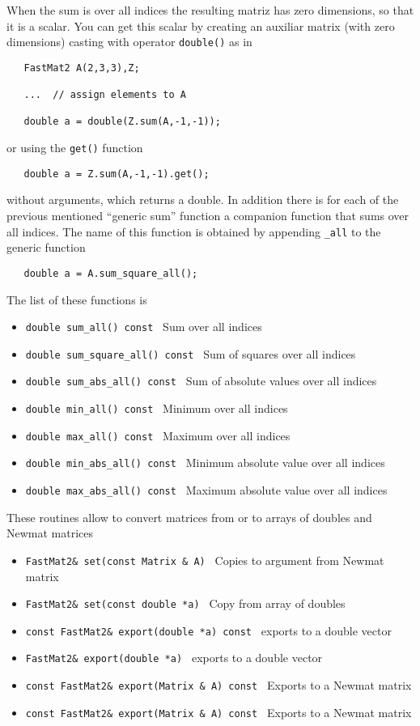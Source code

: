 {

When the sum is over all indices the resulting matriz has zero
dimensions, so that it is a scalar. You can get this scalar by
creating an auxiliar matrix (with zero dimensions) casting with
operator \verb+double()+ as in
%
\begin{verbatim}
   FastMat2 A(2,3,3),Z;

   ...  // assign elements to A

   double a = double(Z.sum(A,-1,-1));
\end{verbatim}
%
or using the \verb+get()+ function 
%
\begin{verbatim}
   double a = Z.sum(A,-1,-1).get();
\end{verbatim}
%
without arguments, which returns a double. In addition there is for
each of the previous mentioned ``generic sum'' function a companion
function that sums over all indices. The name of this function is
obtained by appending \verb+_all+ to the generic function
%
\begin{verbatim}
   double a = A.sum_square_all();
\end{verbatim}
%
The list of these functions is
%
\begin{itemize}
\item \verb+double sum_all() const +
              Sum over all indices 
\item \verb+double sum_square_all() const +
              Sum of squares over all indices 
\item \verb+double sum_abs_all() const +
              Sum of absolute values over all indices 
\item \verb+double min_all() const +
              Minimum over all indices 
\item \verb+double max_all() const +
              Maximum over all indices 
\item \verb+double min_abs_all() const +
              Minimum absolute value over all indices 
\item \verb+double max_abs_all() const +
              Maximum absolute value over all indices 
\end{itemize}


These routines allow to convert matrices from or to arrays of doubles
and Newmat matrices
%
\begin{itemize}
\item \verb+FastMat2& set(const Matrix & A) +
              Copies to argument from Newmat matrix 
\item \verb+FastMat2& set(const double *a) +
              Copy from array of doubles 
\item \verb+const FastMat2& export(double *a) const +
              exports to a double vector 
\item \verb+FastMat2& export(double *a) +
              exports to a double vector 
\item \verb+const FastMat2& export(Matrix & A) const +
              Exports to a Newmat matrix 
\item \verb+const FastMat2& export(Matrix & A) const +
              Exports to a Newmat matrix 
\end{itemize}

}
